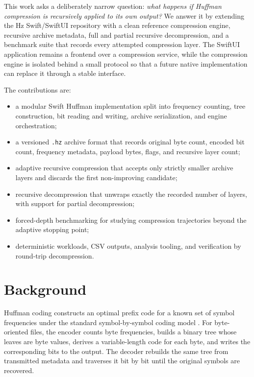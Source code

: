\documentclass[conference]{IEEEtran}
\begin{document}
This work asks a deliberately narrow question: \emph{what happens if Huffman compression is recursively applied to its own output?} We answer it by extending the Hz Swift/SwiftUI repository with a clean reference compression engine, recursive archive metadata, full and partial recursive decompression, and a benchmark suite that records every attempted compression layer. The SwiftUI application remains a frontend over a compression service, while the compression engine is isolated behind a small protocol so that a future native implementation can replace it through a stable interface.

The contributions are:
\begin{itemize}
    \item a modular Swift Huffman implementation split into frequency counting, tree construction, bit reading and writing, archive serialization, and engine orchestration;
    \item a versioned \texttt{.hz} archive format that records original byte count, encoded bit count, frequency metadata, payload bytes, flags, and recursive layer count;
    \item adaptive recursive compression that accepts only strictly smaller archive layers and discards the first non-improving candidate;
    \item recursive decompression that unwraps exactly the recorded number of layers, with support for partial decompression;
    \item forced-depth benchmarking for studying compression trajectories beyond the adaptive stopping point;
    \item deterministic workloads, CSV outputs, analysis tooling, and verification by round-trip decompression.
\end{itemize}

\section{Background}

Huffman coding constructs an optimal prefix code for a known set of symbol frequencies under the standard symbol-by-symbol coding model \cite{huffman1952method}. For byte-oriented files, the encoder counts byte frequencies, builds a binary tree whose leaves are byte values, derives a variable-length code for each byte, and writes the corresponding bits to the output. The decoder rebuilds the same tree from transmitted metadata and traverses it bit by bit until the original symbols are recovered.
\end{document}
